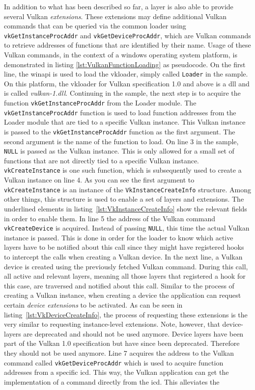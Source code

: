     In addition to what has been described so far, a layer is also able to provide several Vulkan \textit{extensions}. These extensions may define additional Vulkan commands that can be queried via the common loader using \lstinline{vkGetInstanceProcAddr} and \lstinline{vkGetDeviceProcAddr}, which are Vulkan commands to retrieve addresses of functions that are identified by their name. Usage of these Vulkan commands, in the context of a \gls{windows} operating system platform, is demonstrated in listing \ref{lst:VulkanFunctionLoading} as pseudocode. On the first line, the \gls{winapi} is used to load the \gls{vkloader}, simply called \lstinline{Loader} in the sample. On this platform, the \gls{vkloader} for Vulkan specification 1.0 and above is a \gls{dll} and is called \textit{vulkan-1.dll}. Continuing in the sample, the next step is to acquire the function \lstinline{vkGetInstanceProcAddr} from the Loader module. The \lstinline{vkGetInstanceProcAddr} function is used to load function addresses from the Loader module that are tied to a specific Vulkan instance. This Vulkan instance is passed to the \lstinline{vkGetInstanceProcAddr} function as the first argument. The second argument is the name of the function to load. On line 3 in the sample, \lstinline{NULL} is passed as the Vulkan instance. This is only allowed for a small set of functions that are not directly tied to a specific Vulkan instance. \lstinline{vkCreateInstance} is one such function, which is subsequently used to create a Vulkan instance on line 4. As you can see the first argument to \lstinline{vkCreateInstance} is an instance of the \lstinline{VkInstanceCreateInfo} structure. Among other things, this structure is used to enable a set of layers and extensions. The underlined elements in listing~\ref{lst:VkInstanceCreateInfo} show the relevant fields in order to enable them. In line 5 the address of the Vulkan command \lstinline{vkCreateDevice} is acquired. Instead of passing \lstinline{NULL}, this time the actual Vulkan instance is passed. This is done in order for the loader to know which active layers have to be notified about this call since they might have registered hooks to intercept the calls when creating a Vulkan device. In the next line, a Vulkan device is created using the previously fetched Vulkan command. During this call, all active and relevant layers, meaning all those layers that registered a hook for this case, are traversed and notified about this call. Similar to the process of creating a Vulkan instance, when creating a device the application can request certain \textit{device extensions} to be activated. As can be seen in listing~\ref{lst:VkDeviceCreateInfo}, the process of requesting these extensions is the very similar to requesting instance-level extensions. Note, however, that device-layers are deprecated and should not be used anymore. Device layers have been part of the Vulkan 1.0 specification but have since been deprecated.  Therefore they should not be used anymore. Line 7 acquires the address to the Vulkan command called \lstinline{vkGetDeviceProcAddr} which is used to acquire function addresses from a specific \gls{icd}. This way, the Vulkan application can get the implementation of a command directly from the \gls{icd}. This alleviates the 